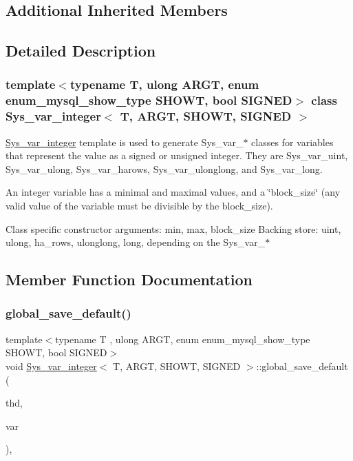 \subsection*{Additional Inherited Members}


\subsection{Detailed Description}
\subsubsection*{template$<$typename T, ulong A\+R\+GT, enum enum\+\_\+mysql\+\_\+show\+\_\+type S\+H\+O\+WT, bool S\+I\+G\+N\+ED$>$\newline
class Sys\+\_\+var\+\_\+integer$<$ T, A\+R\+G\+T, S\+H\+O\+W\+T, S\+I\+G\+N\+E\+D $>$}

\mbox{\hyperlink{classSys__var__integer}{Sys\+\_\+var\+\_\+integer}} template is used to generate Sys\+\_\+var\+\_\+$\ast$ classes for variables that represent the value as a signed or unsigned integer. They are Sys\+\_\+var\+\_\+uint, Sys\+\_\+var\+\_\+ulong, Sys\+\_\+var\+\_\+harows, Sys\+\_\+var\+\_\+ulonglong, and Sys\+\_\+var\+\_\+long.

An integer variable has a minimal and maximal values, and a \char`\"{}block\+\_\+size\char`\"{} (any valid value of the variable must be divisible by the block\+\_\+size).

Class specific constructor arguments\+: min, max, block\+\_\+size Backing store\+: uint, ulong, ha\+\_\+rows, ulonglong, long, depending on the Sys\+\_\+var\+\_\+$\ast$ 

\subsection{Member Function Documentation}
\mbox{\label{classSys__var__integer_a59952c5211c10659bc16a0f5f5706e9f}} 
\subsubsection{\texorpdfstring{global\+\_\+save\+\_\+default()}{global\_save\_default()}}
{\footnotesize\ttfamily template$<$typename T , ulong A\+R\+GT, enum enum\+\_\+mysql\+\_\+show\+\_\+type S\+H\+O\+WT, bool S\+I\+G\+N\+ED$>$ \\
void \mbox{\hyperlink{classSys__var__integer}{Sys\+\_\+var\+\_\+integer}}$<$ T, A\+R\+GT, S\+H\+O\+WT, S\+I\+G\+N\+ED $>$\+::global\+\_\+save\+\_\+default (\begin{DoxyParamCaption}\item[{T\+HD $\ast$}]{thd,  }\item[{\mbox{\hyperlink{classset__var}{set\+\_\+var}} $\ast$}]{var }\end{DoxyParamCaption})\hspace{0.3cm}{\ttfamily [inline]}, {\ttfamily [virtual]}}

